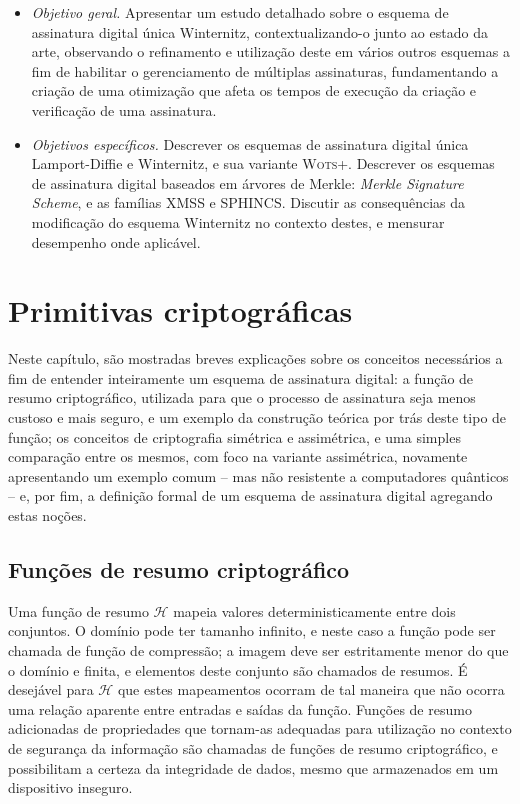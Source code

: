 \documentclass[12pt]{report}
\newcommand{\hh}{$\mathcal{H}$}
\begin{document}
\begin{itemize}

\item \emph{Objetivo geral.} Apresentar um estudo detalhado sobre o esquema de
    assinatura digital única Winternitz, contextualizando-o junto ao estado da
    arte, observando o refinamento e utilização deste em vários outros esquemas
    a fim de habilitar o gerenciamento de múltiplas assinaturas, fundamentando
    a criação de uma otimização que afeta os tempos de execução da criação e
    verificação de uma assinatura.
    
\item \emph{Objetivos específicos.} Descrever os esquemas de assinatura digital
    única Lamport-Diffie e Winternitz, e sua variante \textsc{Wots+}. Descrever
    os esquemas de assinatura digital baseados em árvores de Merkle: \emph{Merkle
    Signature Scheme}, e as famílias XMSS e SPHINCS. Discutir as consequências
    da modificação do esquema Winternitz no contexto destes, e mensurar desempenho
    onde aplicável.

\end{itemize}

\chapter{Primitivas criptográficas}

Neste capítulo, são mostradas breves explicações sobre os conceitos
necessários a fim de entender inteiramente um esquema de assinatura digital:
a função de resumo criptográfico, utilizada para que o processo de assinatura
seja menos custoso e mais seguro, e um exemplo da construção teórica por trás
deste tipo de função; os conceitos de criptografia simétrica e assimétrica, e
uma simples comparação entre os mesmos, com foco na variante assimétrica,
novamente apresentando um exemplo comum -- mas não resistente a computadores
quânticos -- e, por fim, a definição formal de um esquema de assinatura digital
agregando estas noções.

\section{Funções de resumo criptográfico}

Uma função de resumo \hh{} mapeia valores deterministicamente entre dois
conjuntos. O domínio pode ter tamanho infinito, e neste caso a função pode ser
chamada de função de compressão; a imagem deve ser estritamente menor do que o
domínio e finita, e elementos deste conjunto são chamados de resumos. É
desejável para \hh{} que estes mapeamentos ocorram de tal maneira que não
ocorra uma relação aparente entre entradas e saídas da função. Funções de
resumo adicionadas de propriedades que tornam-as adequadas para utilização no
contexto de segurança da informação são chamadas de funções de resumo
criptográfico, e possibilitam a certeza da integridade de dados, mesmo que
armazenados em um dispositivo inseguro.
\end{document}
